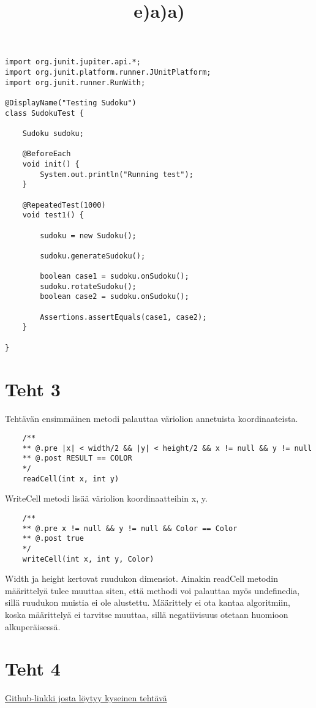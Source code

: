 \documentclass[a4paper,12pt,titlepage]{article}
\theoremstyle{definition}
\theoremstyle{remark}
\begin{document}
\title{e)}
\begin{lstlisting}
import org.junit.jupiter.api.*;
import org.junit.platform.runner.JUnitPlatform;
import org.junit.runner.RunWith;

@DisplayName("Testing Sudoku")
class SudokuTest {

    Sudoku sudoku;

    @BeforeEach
    void init() {
        System.out.println("Running test");
    }

    @RepeatedTest(1000)
    void test1() {

        sudoku = new Sudoku();

        sudoku.generateSudoku();

        boolean case1 = sudoku.onSudoku();
        sudoku.rotateSudoku();
        boolean case2 = sudoku.onSudoku();

        Assertions.assertEquals(case1, case2);
    }

}

\end{lstlisting}
\newpage
\section{Teht 3}
\title{a)}
\newline
Tehtävän ensimmäinen metodi palauttaa väriolion annetuista koordinaateista.

\begin{lstlisting}
    /**
    ** @.pre |x| < width/2 && |y| < height/2 && x != null && y != null
    ** @.post RESULT == COLOR
    */
    readCell(int x, int y)
\end{lstlisting}
WriteCell metodi lisää väriolion koordinaatteihin x, y.
\begin{lstlisting}
    /**
    ** @.pre x != null && y != null && Color == Color
    ** @.post true
    */
    writeCell(int x, int y, Color)
\end{lstlisting}
Width ja height kertovat ruudukon dimensiot. Ainakin readCell metodin määrittelyä tulee muuttaa siten, että methodi voi palauttaa myös undefinedia, sillä ruudukon muistia ei ole alustettu. Määrittely ei ota kantaa algoritmiin, koska määrittelyä ei tarvitse muuttaa, sillä negatiivisuus otetaan huomioon alkuperäisessä.
\section{Teht 4}
\title{a)}
\href{https://github.com/MatiasLappalainen/oom_harkka/blob/master/src/main/java/Tetris.java}{Github-linkki josta löytyy kyseinen tehtävä}
\end{document}
